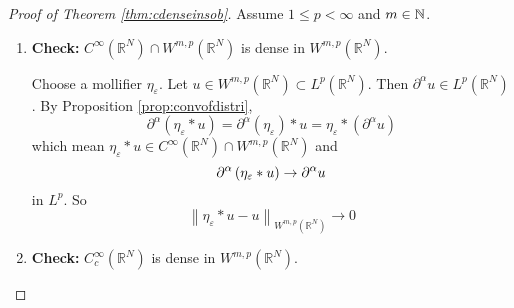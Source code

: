 \begin{proof}[Proof of Theorem \ref{thm:cdenseinsob}]
	Assume $1 \leq p < \infty$ and $m \in \mathbb{N}$.
	\begin{enumerate}[label=(\roman*)]
		\item \textbf{Check:} $C^{\infty}\left(\mathbb{R}^N\right) \cap W^{m, p}\left(\mathbb{R}^N\right)$ is dense in $W^{m, p}\left(\mathbb{R}^N\right)$.

		\noindent Choose a mollifier $\eta_\varepsilon$. Let $u \in W^{m, p}\left(\mathbb{R}^N\right) \subset L^p\left(\mathbb{R}^N\right)$. Then $\partial^\alpha u \in L^p\left(\mathbb{R}^N\right)$. By Proposition \ref{prop:convofdistri},
		\begin{equation*}
			\partial^\alpha\left(\eta_{\varepsilon} * u\right) = \partial^\alpha\left(\eta_{\varepsilon}\right) * u= \eta_{\varepsilon} * \left(\partial^\alpha u\right)
		\end{equation*}
		which mean $\eta_{\varepsilon} * u \in C^{\infty}\left(\mathbb{R}^N\right) \cap W^{m, p}\left(\mathbb{R}^N\right)$ and
		\begin{equation*}
			\partial^\alpha\left(\eta_{\varepsilon} * u\right) \rightarrow \partial^\alpha u
		\end{equation*}
		in $L^p$. So
		\begin{equation*}
			\left\|\eta_{\varepsilon} * u-u\right\|_{W^{m, p}\left(\mathbb{R}^N\right)} \longrightarrow 0
		\end{equation*}

		\item \textbf{Check:} $C^{\infty}_c\left(\mathbb{R}^N\right)$ is dense in $W^{m, p}\left(\mathbb{R}^N\right)$.


\end{enumerate}
\end{proof}
